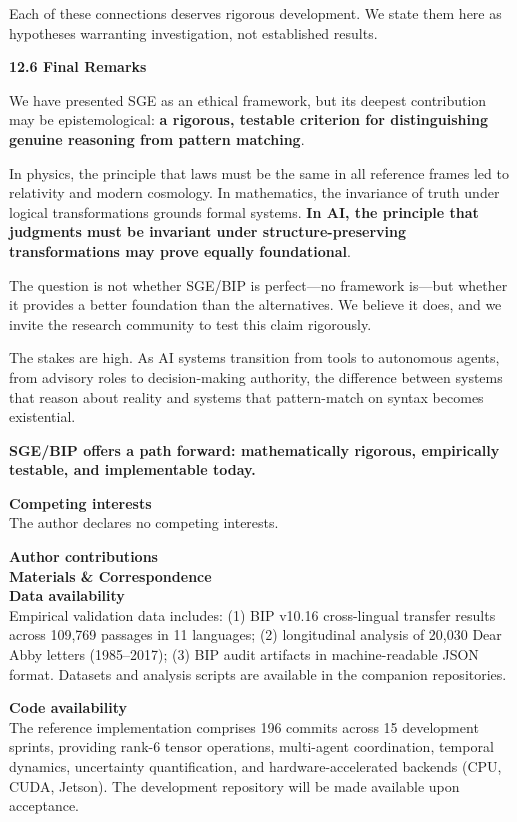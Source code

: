 \documentclass[12pt]{article}
\theoremstyle{plain}
\theoremstyle{definition}
\theoremstyle{remark}
\begin{document}
Each of these connections deserves rigorous development. We state them
here as hypotheses warranting investigation, not established results.

\textbf{12.6 Final Remarks}

We have presented SGE as an ethical framework, but its deepest
contribution may be epistemological: \textbf{a rigorous, testable
criterion for distinguishing genuine reasoning from pattern matching}.

In physics, the principle that laws must be the same in all reference
frames led to relativity and modern cosmology. In mathematics, the
invariance of truth under logical transformations grounds formal
systems. \textbf{In AI, the principle that judgments must be invariant
under structure-preserving transformations may prove equally
foundational}.

The question is not whether SGE/BIP is perfect---no framework is---but
whether it provides a better foundation than the alternatives. We
believe it does, and we invite the research community to test this claim
rigorously.

The stakes are high. As AI systems transition from tools to autonomous
agents, from advisory roles to decision-making authority, the difference
between systems that reason about reality and systems that pattern-match
on syntax becomes existential.

\textbf{SGE/BIP offers a path forward: mathematically rigorous,
empirically testable, and implementable today.}

\textbf{Competing interests}\\
The author declares no competing interests.

\textbf{Author contributions}\\
[Removed for blind review]

\textbf{Materials \& Correspondence}\\
[Removed for blind review]

\textbf{Data availability}\\
Empirical validation data includes: (1) BIP v10.16 cross-lingual
transfer results across 109,769 passages in 11 languages; (2)
longitudinal analysis of 20,030 Dear Abby letters (1985--2017); (3)
BIP audit artifacts in machine-readable JSON format. Datasets and
analysis scripts are available in the companion repositories.

\textbf{Code availability}\\
The reference implementation comprises 196 commits across 15
development sprints, providing rank-6 tensor operations, multi-agent
coordination, temporal dynamics, uncertainty quantification, and
hardware-accelerated backends (CPU, CUDA, Jetson). The development
repository will be made available upon acceptance.
\end{document}
